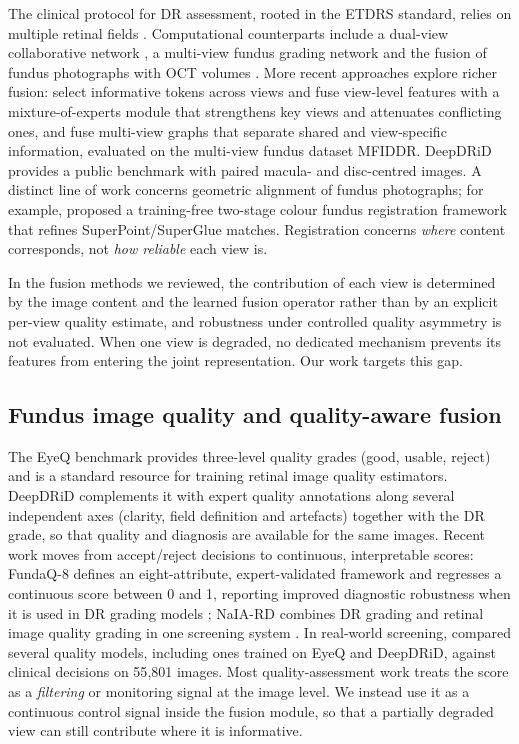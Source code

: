 \documentclass[final,5p,times,twocolumn,authoryear]{elsarticle}
\theoremstyle{plain}
\theoremstyle{remark}
\begin{document}
The clinical protocol for DR assessment, rooted in the ETDRS standard, relies on multiple retinal fields \citep{ETDRS1991report10}. Computational counterparts include a dual-view collaborative network \citep{Zhao2019multiview}, a multi-view fundus grading network \citep{Sun2021dualview} and the fusion of fundus photographs with OCT volumes \citep{Wang2021mvdr}. More recent approaches explore richer fusion: \citet{Luo2025dynsel} select informative tokens across views and fuse view-level features with a mixture-of-experts module that strengthens key views and attenuates conflicting ones, and \citet{Li2026mvgfdr} fuse multi-view graphs that separate shared and view-specific information, evaluated on the multi-view fundus dataset MFIDDR. DeepDRiD \citep{Liu2022deepdrid} provides a public benchmark with paired macula- and disc-centred images. A distinct line of work concerns geometric alignment of fundus photographs; for example, \citet{Yan2025fundusreg} proposed a training-free two-stage colour fundus registration framework that refines SuperPoint/SuperGlue matches. Registration concerns \emph{where} content corresponds, not \emph{how reliable} each view is.

In the fusion methods we reviewed, the contribution of each view is determined by the image content and the learned fusion operator rather than by an explicit per-view quality estimate, and robustness under controlled quality asymmetry is not evaluated. When one view is degraded, no dedicated mechanism prevents its features from entering the joint representation. Our work targets this gap.

\subsection{Fundus image quality and quality-aware fusion}
\label{sec:rw-fiqa}

The EyeQ benchmark \citep{Shen2020eyeq} provides three-level quality grades (good, usable, reject) and is a standard resource for training retinal image quality estimators. DeepDRiD \citep{Liu2022deepdrid} complements it with expert quality annotations along several independent axes (clarity, field definition and artefacts) together with the DR grade, so that quality and diagnosis are available for the same images. Recent work moves from accept/reject decisions to continuous, interpretable scores: FundaQ-8 defines an eight-attribute, expert-validated framework and regresses a continuous score between 0 and 1, reporting improved diagnostic robustness when it is used in DR grading models \citep{Zun2025fundaq8}; NaIA-RD combines DR grading and retinal image quality grading in one screening system \citep{Pinto2025naia}. In real-world screening, \citet{Pinto2026riqmonitor} compared several quality models, including ones trained on EyeQ and DeepDRiD, against clinical decisions on 55{,}801 images. Most quality-assessment work treats the score as a \emph{filtering} or monitoring signal at the image level. We instead use it as a continuous control signal inside the fusion module, so that a partially degraded view can still contribute where it is informative.
\end{document}
